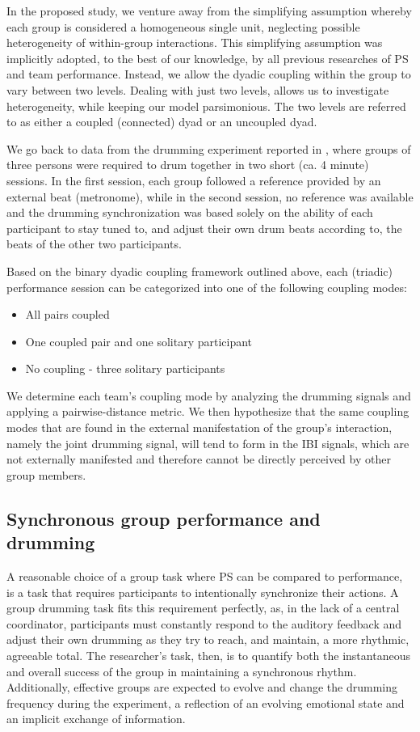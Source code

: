 \documentclass[a4paper, 11pt]{report}      %
\begin{document}
In the proposed study, we venture away from the simplifying assumption whereby each group is considered a homogeneous single unit, neglecting possible heterogeneity of within-group interactions. This simplifying assumption was implicitly adopted, to the best of our knowledge, by all previous researches of PS and team performance. Instead, we allow the dyadic coupling within the group to vary between two levels. Dealing with just two levels, allows us to investigate heterogeneity, while keeping our model parsimonious. The two levels are referred to as either a coupled (connected) dyad or an uncoupled dyad. 

We go back to data from the drumming experiment reported in \citet{gordon2020physio}, where groups of three persons were required to drum together in two short (ca. 4 minute) sessions. In the first session, each group followed a reference provided by an external beat (metronome), while in the second session, no reference was available and the drumming synchronization was based solely on the ability of each participant to stay tuned to, and adjust their own drum beats according to, the beats of the other two participants. 

Based on the binary dyadic coupling framework outlined above, each (triadic) performance session can be categorized into one of the following coupling modes:
\begin{itemize}
    \item All pairs coupled
    \item One coupled pair and one solitary participant
    \item No coupling - three solitary participants
\end{itemize}

We determine each team's coupling mode by analyzing the drumming signals and applying a pairwise-distance metric. We then hypothesize that the same coupling modes that are found in the external manifestation of the group's interaction, namely the joint drumming signal, will tend to form in the IBI signals, which are not externally manifested and therefore cannot be directly perceived by other group members. 

\subsection{Synchronous group performance  and drumming}
A reasonable choice of a group task where PS can be compared to performance, is a task that requires participants to intentionally synchronize their actions. A group drumming task fits this requirement perfectly, as, in the lack of a central coordinator, participants must constantly respond to the auditory feedback and adjust their own drumming as they try to reach, and maintain, a more rhythmic, agreeable total. The researcher's task, then, is to quantify both the instantaneous and overall success of the group in maintaining a synchronous rhythm. Additionally, effective groups are expected to evolve and change the drumming frequency during the experiment, a reflection of an evolving emotional state and an implicit exchange of information.
\end{document}
